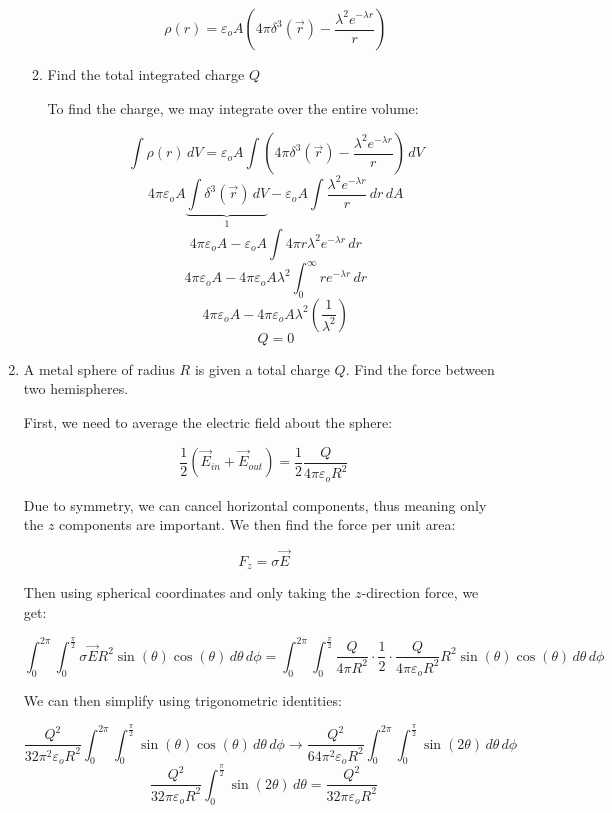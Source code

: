 \begin{enumerate}
\begin{enumerate}
      $$\boxed{\rho(r)=\varepsilon_oA\left( 4\pi\delta^3(\vec{r})-\frac{\lambda^2e^{-\lambda r}}{r} \right)}$$

      \item Find the total integrated charge $Q$

        To find the charge, we may integrate over the entire volume:

        $$\int\rho(r)\,dV=\varepsilon_oA\int\left( 4\pi\delta^3(\vec{r})-\frac{\lambda^2e^{-\lambda r}}{r} \right)\,dV$$
        $$4\pi\varepsilon_oA\underbrace{\int\delta^3(\vec{r})\,dV}_{1}-\varepsilon_oA\int\frac{\lambda^2e^{-\lambda r}}{r}\,dr\,dA$$
        $$4\pi\varepsilon_oA-\varepsilon_oA\int4\pi r\lambda^2e^{-\lambda r}\,dr$$
        $$4\pi\varepsilon_oA-4\pi\varepsilon_oA\lambda^2\int_0^\infty re^{-\lambda r}\,dr$$
        $$4\pi\varepsilon_oA-4\pi\varepsilon_oA\lambda^2\left( \frac{1}{\lambda^2} \right)$$
        $$\boxed{Q=0}$$

    \end{enumerate}

  \item A metal sphere of radius $R$ is given a total charge $Q$. Find the force between two hemispheres.

    First, we need to average the electric field about the sphere:

    $$\frac{1}{2}\left( \vec{E}_{in}+\vec{E}_{out} \right)=\frac{1}{2}\frac{Q}{4\pi\varepsilon_oR^2}$$

    Due to symmetry, we can cancel horizontal components, thus meaning only the $z$ components are important. We then find the force per unit area:

    $$F_z=\sigma \vec{E}$$

    Then using spherical coordinates and only taking the $z$-direction force, we get:

    $$\int_0^{2\pi}\int_0^{\frac{\pi}{2}}\sigma \vec{E}R^2\sin(\theta)\cos(\theta)\,d\theta\,d\phi=\int_0^{2\pi}\int_0^{\frac{\pi}{2}}\frac{Q}{4\pi R^2}\cdot\frac{1}{2}\cdot\frac{Q}{4\pi\varepsilon_oR^2} R^2\sin(\theta)\cos(\theta)\,d\theta\,d\phi$$

    We can then simplify using trigonometric identities:

    $$\frac{Q^2}{32\pi^2 \varepsilon_oR^2}\int_0^{2\pi}\int_0^{\frac{\pi}{2}}\sin(\theta)\cos(\theta)\,d\theta\,d\phi\rightarrow\frac{Q^2}{64\pi^2 \varepsilon_oR^2}\int_0^{2\pi}\int_0^{\frac{\pi}{2}}\sin(2\theta)\,d\theta\,d\phi$$
    $$\boxed{\frac{Q^2}{32\pi \varepsilon_oR^2}\int_0^{\frac{\pi}{2}}\sin(2\theta)\,d\theta=\frac{Q^2}{32\pi \varepsilon_oR^2}}$$


\end{enumerate}
